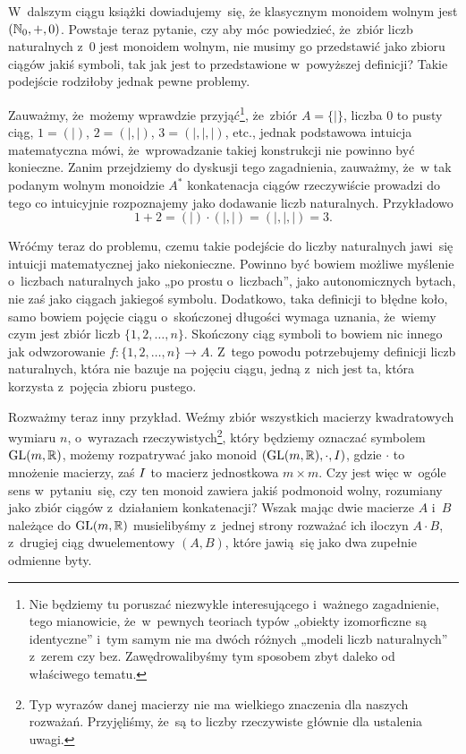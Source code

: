 \documentclass[a4paper,11pt]{article}
\begin{document}
W~dalszym ciągu książki dowiadujemy~się, że klasycznym monoidem wolnym
jest $( \mathbb{N}_{ 0 }, +, 0 )$. Powstaje teraz pytanie, czy aby móc
powiedzieć, że~zbiór liczb naturalnych z~$0$ jest monoidem wolnym, nie
musimy go przedstawić jako zbioru ciągów jakiś symboli, tak jak jest
to przedstawione w~powyższej definicji? Takie podejście rodziłoby
jednak pewne problemy.

Zauważmy, że~możemy wprawdzie przyjąć\footnote{Nie będziemy tu
  poruszać niezwykle interesującego i~ważnego zagadnienie, tego
  mianowicie, że~w~pewnych teoriach typów „obiekty izomorficzne są
  identyczne” i~tym samym nie ma dwóch różnych „modeli liczb
  naturalnych” z~zerem czy bez. Zawędrowalibyśmy tym sposobem zbyt
  daleko od właściwego tematu.}, że~zbiór $A = \{ | \}$, liczba $0$ to
pusty ciąg, $1 = ( | )$, $2 = ( |, | )$, $3 = ( |, |, | )$, etc.,
jednak podstawowa intuicja matematyczna mówi, że~wprowadzanie takiej
konstrukcji nie powinno być konieczne. Zanim przejdziemy do dyskusji
tego zagadnienia, zauważmy, że~w tak podanym wolnym monoidzie
$A^{ * }$ konkatenacja ciągów rzeczywiście prowadzi do tego co
intuicyjnie rozpoznajemy jako dodawanie liczb naturalnych. Przykładowo
\begin{equation}
  \label{eq:Forys-Forys-06}
  1 + 2 = ( | ) \cdot ( |, | ) = ( |, |, | ) = 3.
\end{equation}

Wróćmy teraz do problemu, czemu takie podejście do liczby naturalnych
jawi~się intuicji matematycznej jako niekonieczne. Powinno być bowiem
możliwe myślenie o~liczbach naturalnych jako „po prostu o~liczbach”,
jako autonomicznych bytach, nie zaś jako ciągach jakiegoś symbolu.
Dodatkowo, taka definicji to błędne koło, samo bowiem pojęcie ciągu
o~skończonej długości wymaga uznania, że~wiemy czym jest zbiór liczb
$\{ 1, 2, \ldots, n \}$. Skończony ciąg symboli to bowiem nic innego
jak odwzorowanie $f : \{ 1, 2, \ldots, n \} \to A$. Z~tego powodu
potrzebujemy definicji liczb naturalnych, która nie bazuje na pojęciu
ciągu, jedną z~nich jest ta, która korzysta z~pojęcia zbioru pustego.

Rozważmy teraz inny przykład. Weźmy zbiór wszystkich macierzy kwadratowych
wymiaru $n$, o~wyrazach rzeczywistych\footnote{Typ wyrazów danej macierzy
  nie ma wielkiego znaczenia dla naszych rozważań. Przyjęliśmy, że~są to
  liczby rzeczywiste głównie dla ustalenia uwagi.}, który będziemy oznaczać
symbolem $\mathrm{GL}( m, \mathbb{R} )$, możemy rozpatrywać jako monoid
$( \mathrm{GL}( m, \mathbb{R} ), \cdot, I )$, gdzie $\cdot$ to mnożenie macierzy, zaś
$I$ to macierz jednostkowa $m \times m$. Czy jest więc w~ogóle sens
w~pytaniu~się, czy ten monoid zawiera jakiś podmonoid wolny, rozumiany
jako zbiór ciągów z~działaniem konkatenacji? Wszak mając dwie macierze
$A$ i~$B$ należące do $\mathrm{GL}( m, \mathbb{R} )$ musielibyśmy z~jednej strony rozważać
ich iloczyn $A \cdot B$, z~drugiej ciąg dwuelementowy $( A, B )$, które
jawią~się jako dwa zupełnie odmienne byty.
\end{document}
